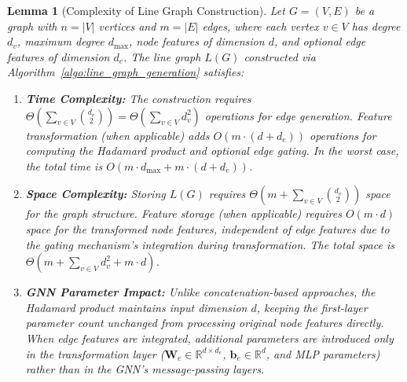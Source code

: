 \documentclass[pdflatex,sn-mathphys-num]{sn-jnl}%
\theoremstyle{thmstyleone}%
\theoremstyle{thmstyletwo}%
\theoremstyle{thmstylethree}%
\theoremstyle{plain} %
\newtheorem{lemma}{Lemma}
\theoremstyle{definition} %
\theoremstyle{remark} %
\theoremstyle{plain} %
\begin{document}
\begin{lemma}[Complexity of Line Graph Construction]
\label{lemma:complexity}
Let $G=(V,E)$ be a graph with $n=|V|$ vertices and $m=|E|$ edges, where each vertex $v \in V$ has degree $d_v$, maximum degree $d_{\max}$, node features of dimension $d$, and optional edge features of dimension $d_e$. The line graph $L(G)$ constructed via Algorithm~\ref{algo:line_graph_generation} satisfies:

\begin{enumerate}
    \item \textbf{Time Complexity:} The construction requires $\Theta\left(\sum_{v \in V} \binom{d_v}{2}\right) = \Theta\left(\sum_{v \in V} d_v^2\right)$ operations for edge generation. Feature transformation (when applicable) adds $O(m \cdot (d + d_e))$ operations for computing the Hadamard product and optional edge gating. In the worst case, the total time is $O(m \cdot d_{\max} + m \cdot (d + d_e))$.
    
    \item \textbf{Space Complexity:} Storing $L(G)$ requires $\Theta\left(m + \sum_{v \in V} \binom{d_v}{2}\right)$ space for the graph structure. Feature storage (when applicable) requires $O(m \cdot d)$ space for the transformed node features, independent of edge features due to the gating mechanism's integration during transformation. The total space is $\Theta\left(m + \sum_{v \in V} d_v^2 + m \cdot d\right)$.
    
    \item \textbf{GNN Parameter Impact:} Unlike concatenation-based approaches, the Hadamard product maintains input dimension $d$, keeping the first-layer parameter count unchanged from processing original node features directly. When edge features are integrated, additional parameters are introduced only in the transformation layer ($\mathbf{W}_e \in \mathbb{R}^{d \times d_e}$, $\mathbf{b}_e \in \mathbb{R}^d$, and MLP parameters) rather than in the GNN's message-passing layers.
\end{enumerate}
\end{lemma}
\end{document}
